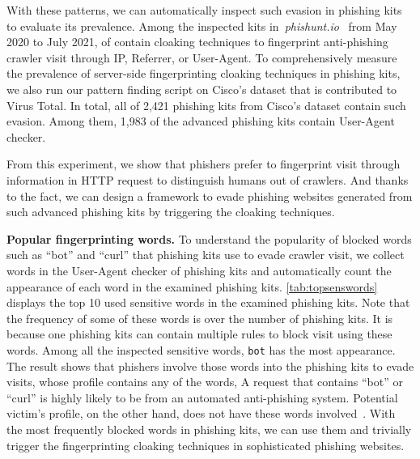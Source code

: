 With these patterns, we can automatically inspect such evasion in phishing kits to evaluate its prevalence.
Among the inspected kits in~\emph{phishunt.io}~\cite{phishunt} from May 2020 to July 2021, \fpphishingkit of \totalphishingkit contain cloaking techniques to fingerprint anti-phishing crawler visit through IP, Referrer, or User-Agent.
To comprehensively measure the prevalence of server-side fingerprinting cloaking techniques in phishing kits,
we also run our pattern finding script on Cisco's dataset that is contributed to Virus Total.
In total, all of 2,421 phishing kits from Cisco's dataset contain such evasion.
Among them, 1,983 of the advanced phishing kits contain User-Agent checker.

From this experiment,
we show that phishers prefer to fingerprint visit through information in HTTP request to distinguish humans out of crawlers.
And thanks to the fact, 
we can design a framework to evade phishing websites generated from such advanced phishing kits by triggering the cloaking techniques.



\noindent
\textbf{Popular fingerprinting words.}
To understand the popularity of blocked words such as ``bot'' and ``curl'' that phishing kits use to evade crawler visit,
we collect \numsenswords words in the User-Agent checker of phishing kits and automatically count the appearance of each word in the examined phishing kits.
\autoref{tab:topsenswords} displays the top 10 used sensitive words in the examined phishing kits.
Note that the frequency of some of these words is over the number of phishing kits.
It is because one phishing kits can contain multiple rules to block visit using these words.
Among all the inspected sensitive words, \texttt{bot} has the most appearance.
The result shows that phishers involve those words into the phishing kits to evade visits, whose profile contains any of the words,
A request that contains ``bot'' or ``curl'' is highly likely to be from an automated anti-phishing system.
Potential victim's profile, on the other hand, does not have these words involved~\cite{commonua}.
With the most frequently blocked words in phishing kits, we can use them and trivially trigger the fingerprinting cloaking techniques in sophisticated phishing websites.


\topsenswords